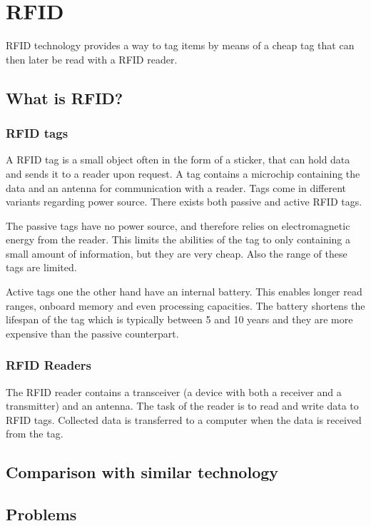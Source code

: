 \section{RFID}
RFID technology provides a way to tag items by means of a cheap tag that can then later be read with a RFID reader.

\subsection{What is RFID?}
\subsubsection{RFID tags} 
A RFID tag is a small object often in the form of a sticker, that can hold data and sends it to a reader upon request.
A tag contains a microchip containing the data and an antenna for communication with a reader.
Tags come in different variants regarding power source.
There exists both passive and active RFID tags.\cite{rfidreview}

The passive tags have no power source, and therefore relies on electromagnetic energy from the reader.
This limits the abilities of the tag to only containing a small amount of information, but they are very cheap.
Also the range of these tags are limited. \cite{rfidreview}

Active tags one the other hand have an internal battery.
This enables longer read ranges, onboard memory and even processing capacities.
The battery shortens the lifespan of the tag which is typically between 5 and 10 years and they are more expensive than the passive counterpart. \cite{rfidreview}

\subsubsection{RFID Readers}
The RFID reader contains a transceiver (a device with both a receiver and a transmitter) and an antenna.
The task of the reader is to read and write data to RFID tags.
Collected data is transferred to a computer when the data is received from the tag.\cite{rfidreview}

\subsection{Comparison with similar technology}


\subsection{Problems}